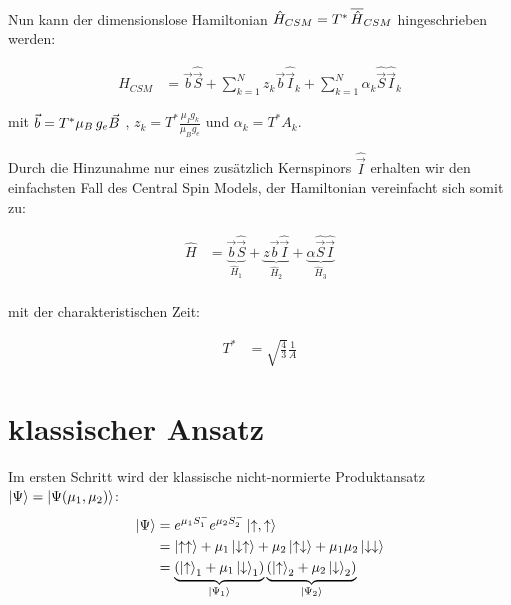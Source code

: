 Nun kann der dimensionslose Hamiltonian $\hat{H}_{CSM} = T^*\thinspace\overline{\hat{H}}_{CSM}$ hingeschrieben werden:

\begin{align}
    \hat{H}_{CSM} &= \vec{b}\hat{\vec{S}} +  \sum_{k=1}^{N}z_k\vec{b}\hat{\vec{I}}_k + \sum_{k=1}^{N} \alpha_k \hat{\vec{S}}\hat{\vec{I}}_k
\end{align}

mit $\vec{b}=T^*\mu_B\thinspace g_e \vec{B}$ , $z_k=T^*\frac{\mu_I g_k}{\mu_B g_e}$ und $\alpha_k = T^* A_k$.

\noindent Durch die Hinzunahme nur eines zusätzlich Kernspinors $\hat{\vec{I}}$ erhalten wir den einfachsten Fall des Central 
Spin Models, der Hamiltonian vereinfacht sich somit zu:

\begin{align}
    \hat{H} &= \underbrace{ \vec{b}\hat{\vec{S}}}_{\hat{H}_1} + \underbrace{z \vec{b}\hat{\vec{I}}}_{\hat{H}_2} + 
    \underbrace{\alpha \hat{\vec{S}}\hat{\vec{I}}}_{\hat{H}_3}\\
\end{align}

 mit der charakteristischen Zeit:

 \begin{align}
    T^* &= \sqrt{\frac{4}{3}}\frac{1}{A}
 \end{align}








\section{klassischer Ansatz}
\noindent Im ersten Schritt wird der klassische nicht-normierte Produktansatz $\ket{\Psi} = \ket{\Psi(\mu_1, \mu_2)}$: 
\begin{align}
    \ket{\Psi} &= e^{\mu_1 S_{1}^{-}}e^{\mu_2 S_{2}^{-}}\ket{\uparrow,\uparrow}\\
                &= \ket{\uparrow \uparrow} +\mu_1\ket{\downarrow \uparrow} + \mu_2\ket{\uparrow \downarrow} + \mu_1\mu_2\ket{\downarrow\downarrow}\\
                &= \underbrace{\left(\ket{\uparrow}_1 + \mu_1\ket{\downarrow}_1\right)}_{\ket{\Psi_1}}\underbrace{\left(\ket{\uparrow}_2 + \mu_2\ket{\downarrow}_2\right)}_{\ket{\Psi_2}}  \\
\end{align}

